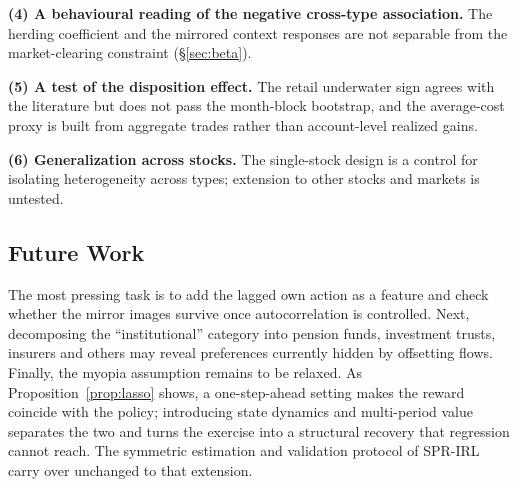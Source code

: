 \textbf{(4) A behavioural reading of the negative cross-type association.} The
herding coefficient and the mirrored context responses are not separable from the
market-clearing constraint (\S\ref{sec:beta}).

\textbf{(5) A test of the disposition effect.} The retail underwater sign agrees
with the literature but does not pass the month-block bootstrap, and the
average-cost proxy is built from aggregate trades rather than account-level
realized gains.

\textbf{(6) Generalization across stocks.} The single-stock design is a control
for isolating heterogeneity across types; extension to other stocks and markets
is untested.

\subsection{Future Work}

The most pressing task is to add the lagged own action as a feature and check
whether the mirror images survive once autocorrelation is controlled. Next,
decomposing the ``institutional'' category into pension funds, investment trusts,
insurers and others may reveal preferences currently hidden by offsetting flows.
Finally, the myopia assumption remains to be relaxed. As
Proposition~\ref{prop:lasso} shows, a one-step-ahead setting makes the reward
coincide with the policy; introducing state dynamics and multi-period value
separates the two and turns the exercise into a structural recovery that
regression cannot reach. The symmetric estimation and validation protocol of
SPR-IRL carry over unchanged to that extension.

